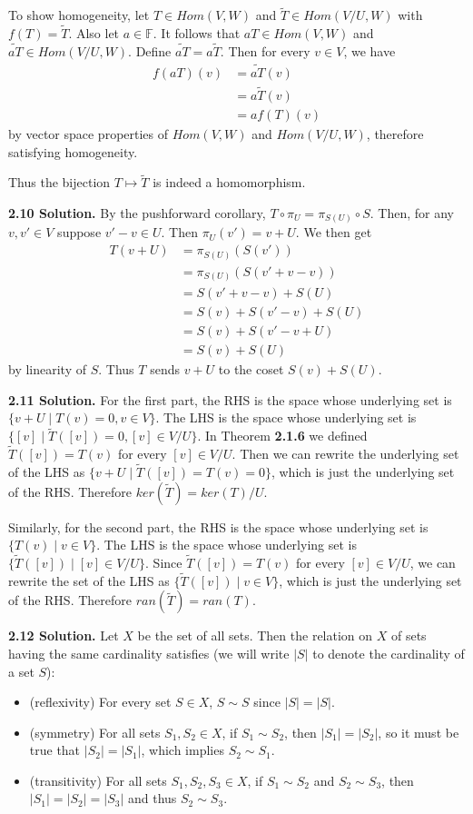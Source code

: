 To show homogeneity, let $T\in Hom(V,W)$ and $\widetilde{T}\in Hom(V/U,W)$ with $f(T)=\widetilde{T}$. Also let $a\in\mathbb{F}$. It follows that $aT\in Hom(V,W)$ and $\widetilde{aT}\in Hom(V/U,W)$. Define $\widetilde{aT} = a\widetilde{T}$. Then for every $v\in V$, we have
\begin{align*}
    f(aT)(v) &= \widetilde{aT}(v) \\
             &= a\widetilde{T}(v) \\
             &= af(T)(v)
\end{align*}
by vector space properties of $Hom(V,W)$ and $Hom(V/U,W)$, therefore satisfying homogeneity.

Thus the bijection $T\mapsto\widetilde{T}$ is indeed a homomorphism.

\textbf{2.10 Solution.} By the pushforward corollary, $T\circ\pi_U = \pi_{S(U)}\circ S$. Then, for any $v,v'\in V$ suppose $v'-v\in U$. Then $\pi_U(v') = v+U$. We then get
\begin{align*}
    T(v+U) &= \pi_{S(U)}(S(v')) \\
           &= \pi_{S(U)}(S(v'+v-v)) \\
           &= S(v'+v-v)+S(U) \\
           &= S(v)+S(v'-v)+S(U) \\
           &= S(v)+S(v'-v+U) \\
           &= S(v)+S(U)
\end{align*}
by linearity of $S$. Thus $T$ sends $v+U$ to the coset $S(v)+S(U)$.

\textbf{2.11 Solution.} For the first part, the RHS is the space whose underlying set is $\{v+U\mid T(v)=0, v\in V\}$. The LHS is the space whose underlying set is $\{[v]\mid \widetilde{T}([v])=0, [v]\in V/U\}$. In Theorem \textbf{2.1.6} we defined $\widetilde{T}([v])=T(v)$ for every $[v]\in V/U$. Then we can rewrite the underlying set of the LHS as $\{v+U\mid \widetilde{T}([v])=T(v)=0\}$, which is just the underlying set of the RHS. Therefore $ker(\widetilde{T}) = ker(T)/U$.

Similarly, for the second part, the RHS is the space whose underlying set is $\{T(v)\mid v\in V\}$. The LHS is the space whose underlying set is $\{\widetilde{T}([v])\mid [v]\in V/U\}$. Since $\widetilde{T}([v])=T(v)$ for every $[v]\in V/U$, we can rewrite the set of the LHS as $\{\widetilde{T}([v])\mid v\in V\}$, which is just the underlying set of the RHS. Therefore $ran(\widetilde{T})=ran(T)$.

\textbf{2.12 Solution.} Let $X$ be the set of all sets. Then the relation on $X$ of sets having the same cardinality satisfies (we will write $|S|$ to denote the cardinality of a set $S$):
\begin{itemize}
    \item (reflexivity) For every set $S\in X$, $S\sim S$ since $|S|=|S|$.
    \item (symmetry) For all sets $S_1,S_2\in X$, if $S_1\sim S_2$, then $|S_1|=|S_2|$, so it must be true that $|S_2|=|S_1|$, which implies $S_2\sim S_1$.
    \item (transitivity) For all sets $S_1,S_2,S_3\in X$, if $S_1\sim S_2$ and $S_2\sim S_3$, then $|S_1|=|S_2|=|S_3|$ and thus $S_2\sim S_3$.
\end{itemize}

